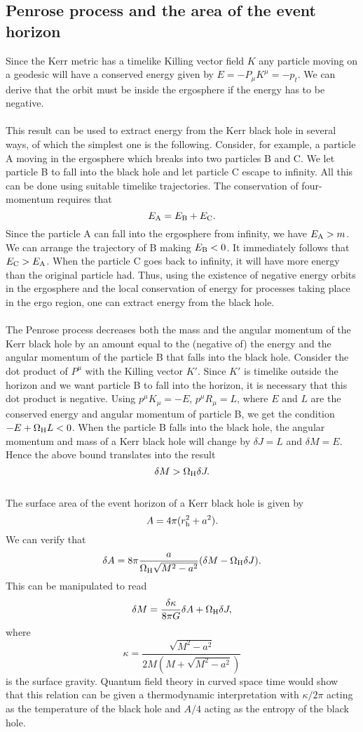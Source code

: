 \documentclass[cyan]{elegantnote}
\begin{document}
\subsection{Penrose process and the area of the event horizon}
Since the Kerr metric has a timelike Killing vector field $K$ any particle moving on a geodesic will have a conserved energy given by $E = -P_{\mu} K^{\mu} = -p_{t}$.
We can derive that the orbit must be inside the ergosphere if the energy has to be negative.
\\ \\
This result can be used to extract energy from the Kerr black hole in several ways, of which the simplest one is the following. 
Consider, for example, a particle A moving in the ergosphere which breaks into two particles B and C. 
We let particle B to fall into the black hole and let particle C escape to infinity. 
All this can be done using suitable timelike trajectories. The conservation of four-momentum requires that
\[E_{\rm A} = E_{\rm B} + E_{\rm C}.\]
Since the particle A can fall into the ergosphere from infinity, we have $E_{\rm A} > m$.
We can arrange the trajectory of B making $E_{\rm B} < 0$. It immediately follows that $E_{\rm C} > E_{\rm A}$. 
When the particle C goes back to infinity, it will have more energy than the original particle had. 
Thus, using the existence of negative energy orbits in the ergosphere and the local conservation of energy for processes taking place in the ergo region, one can extract energy from the black hole.
\\ \\
The Penrose process decreases both the mass and the angular momentum of the Kerr black hole by an amount equal to the (negative of) the energy and the angular momentum of the particle B that falls into the black hole. 
Consider the dot product of $P^{\mu}$ with the Killing vector $K'$. 
Since $K'$ is timelike outside the horizon and we want particle B to fall into the horizon, it is necessary that this dot product is negative. 
Using $p^{\mu}K_{\mu} = -E$, $p^{\mu}R_{\mu} = L$,
where $E$ and $L$ are the conserved energy and angular momentum of particle B, we get the condition $-E + \Omega_{\rm H} L < 0$. 
When the particle B falls into the black hole, the angular momentum and mass of a Kerr black hole will change by $\delta J = L$ and $\delta M = E$. Hence the above bound
translates into the result
\[\delta M > \Omega_{\rm H} \delta J.\]
\\
The surface area of the event horizon of a Kerr black hole is given by
\[A = 4\pi (r_{\rm h}^2 + a^2).\]
We can verify that
\[\delta A = 8\pi \frac{a}{\Omega_{\rm H}\sqrt{M^2-a^2}}(\delta M - \Omega_{\rm H} \delta J).\]
This can be manipulated to read
\[\delta M = \frac{\delta \kappa}{8\pi G} \delta A + \Omega_{\rm H}\delta J,\]
where
\[\kappa = \frac{\sqrt{M^2-a^2}}{2M(M+\sqrt{M^2-a^2})}\]
is the surface gravity. 
Quantum field theory in curved space time would show that this relation can be given a thermodynamic interpretation with $\kappa / 2\pi$ acting as the temperature of the black hole and $A/4$ acting as the entropy of the black hole.
\end{document}
